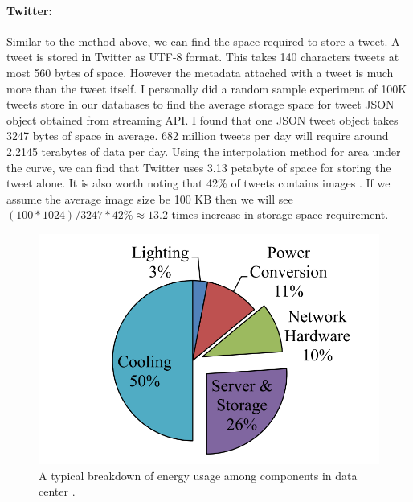 \paragraph{Twitter:}
Similar to the method above, we can find the space required to store a tweet. A
tweet is stored in Twitter as UTF-8 format. This takes 140 characters tweets at
most 560 bytes of space. However the metadata attached with a tweet is much
more than the tweet itself. I personally did a random sample experiment of 100K
tweets store in our databases to find the average storage space for tweet JSON
object obtained from streaming API. I found that one JSON tweet object takes
3247 bytes of space in average.  682 million tweets per day will require around
2.2145 terabytes of data per day. Using the interpolation method for area under
the curve, we can find that Twitter uses 3.13 petabyte of space for storing the
tweet alone. It is also worth noting that 42\% of tweets contains images
\cite{tweets_images}. If we assume the average image size be 100 KB then we
will see $(100 * 1024)/3247 * 42 \% \approx 13.2$ times increase in storage
space requirement.

\begin{figure}[t]
	\includegraphics[width=0.7\linewidth ]{fig/energy_usage.png}
    \vspace{-2mm}
    \caption{A typical breakdown of energy usage among components in data center \cite{info2007top}.}
    \label{fig:energy_usage}
\end{figure}

